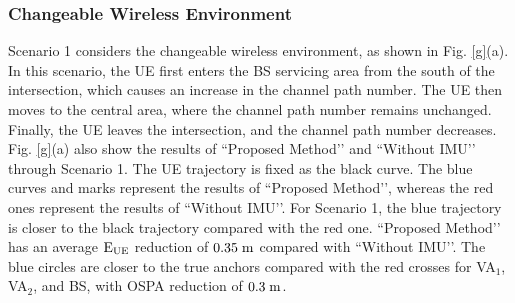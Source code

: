 \documentclass[journal,12pt,onecolumn,draftclsnofoot,]{IEEEtran}
\begin{document}
\subsubsection{Changeable Wireless Environment}
{\color{black}Scenario 1 considers the changeable wireless environment, as shown in Fig. \ref{g}(a). 
In this scenario, the UE first enters the BS servicing area from the south of the intersection, which causes an increase in the channel path number. 
The UE then moves to the central area, where the channel path number remains unchanged. Finally, the UE leaves the intersection, and the channel path number decreases.} 
Fig. \ref{g}(a) also show the results of ``Proposed Method’’ and ``Without IMU’’ through Scenario 1. 
The UE trajectory is fixed as the black curve. 
The blue curves and marks represent the results of ``Proposed Method’’, whereas the red ones represent the results of ``Without IMU’’. 
For Scenario 1, the blue trajectory is closer to the black trajectory compared with the red one. ``Proposed Method’’ has an average ${{\rm{E}}_{{\rm{UE}}}}$ reduction of $0.35\;{\rm m}$ compared with ``Without IMU’’. 
The blue circles are closer to the true anchors compared with the red crosses for VA${_1}$, VA${_2}$, and BS, with OSPA reduction of $0.3\;{\rm m}$. 
\end{document}
